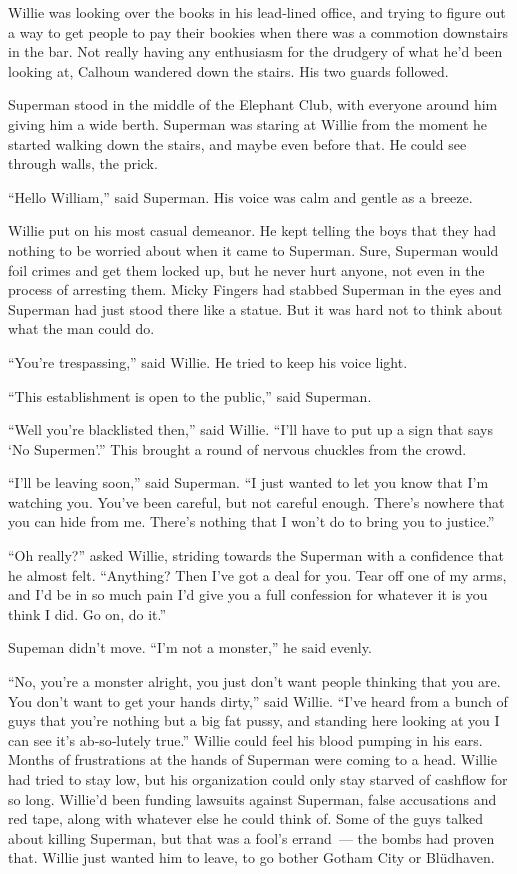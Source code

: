 \documentclass[ebook,12pt]{memoir}
\begin{document}
Willie was looking over the books in his lead‐lined office, and trying
to figure out a way to get people to pay their bookies when there was a
commotion downstairs in the bar. Not really having any enthusiasm for
the drudgery of what he'd been looking at, Calhoun wandered down the
stairs. His two guards followed.

Superman stood in the middle of the Elephant Club, with everyone around
him giving him a wide berth. Superman was staring at Willie from the
moment he started walking down the stairs, and maybe even before that.
He could see through walls, the prick.

``Hello William,'' said Superman. His voice was calm and gentle as a
breeze.

Willie put on his most casual demeanor. He kept telling the boys that
they had nothing to be worried about when it came to Superman. Sure,
Superman would foil crimes and get them locked up, but he never hurt
anyone, not even in the process of arresting them. Micky Fingers had
stabbed Superman in the eyes and Superman had just stood there like a
statue. But it was hard not to think about what the man could do.

``You're trespassing,'' said Willie. He tried to keep his voice light.

``This establishment is open to the public,'' said Superman.

``Well you're blacklisted then,'' said Willie. ``I'll have to put up a
sign that says `No Supermen'.'' This brought a round of nervous chuckles
from the crowd.

``I'll be leaving soon,'' said Superman. ``I just wanted to let you know
that I'm watching you. You've been careful, but not careful enough.
There's nowhere that you can hide from me. There's nothing that I won't
do to bring you to justice.''

``Oh really?'' asked Willie, striding towards the Superman with a
confidence that he almost felt. ``Anything? Then I've got a deal for
you. Tear off one of my arms, and I'd be in so much pain I'd give you a
full confession for whatever it is you think I did. Go on, do it.''

Supeman didn't move. ``I'm not a monster,'' he said evenly.

``No, you're a monster alright, you just don't want people thinking that
you are. You don't want to get your hands dirty,'' said Willie. ``I've
heard from a bunch of guys that you're nothing but a big fat pussy, and
standing here looking at you I can see it's ab‐so‐lutely true.'' Willie
could feel his blood pumping in his ears. Months of frustrations at the
hands of Superman were coming to a head. Willie had tried to stay low,
but his organization could only stay starved of cashflow for so long.
Willie'd been funding lawsuits against Superman, false accusations and
red tape, along with whatever else he could think of. Some of the guys
talked about killing Superman, but that was a fool's errand~--- the
bombs had proven that. Willie just wanted him to leave, to go bother
Gotham City or Blüdhaven.
\end{document}
